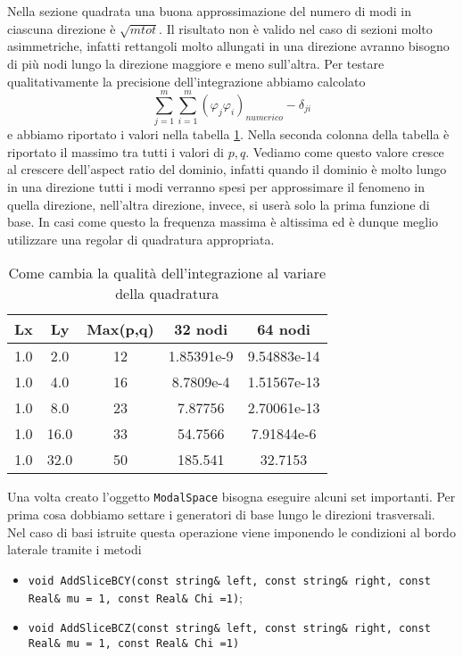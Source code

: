 Nella sezione quadrata una buona approssimazione del numero di modi in ciascuna direzione \`e $\sqrt{mtot}$. Il risultato non \`e valido nel caso di sezioni 
molto asimmetriche, infatti rettangoli molto allungati in una direzione avranno bisogno di pi\`u nodi lungo la direzione maggiore e meno 
sull'altra. Per testare qualitativamente la precisione dell'integrazione abbiamo calcolato $$\sum_{j=1}^m\sum_{i=1}^m 
(\varphi_j\varphi_i)_{numerico}- \delta_{ji}$$ e abbiamo riportato i valori nella tabella \ref{quad}.
Nella seconda colonna della tabella \`e riportato il massimo tra tutti i valori di $p,q$. Vediamo come questo valore cresce 
al crescere dell'aspect ratio del dominio, infatti quando il dominio \`e molto lungo in una direzione tutti i modi verranno spesi
per approssimare il fenomeno in quella direzione, nell'altra direzione, invece, si user\`a solo la prima funzione di base.
In casi come questo la frequenza massima \`e altissima ed \`e dunque meglio utilizzare una regolar di quadratura appropriata.
\begin{table}[h]
\centering
\begin{tabular}{|c|c|c|c|c|}
\hline
Lx&Ly & Max(p,q) &  32 nodi &  64 nodi \\
\hline
1.0&2.0 & 12 & 1.85391e-9 & 9.54883e-14 \\
\hline
1.0&4.0 & 16 & 8.7809e-4 & 1.51567e-13 \\
\hline
1.0&8.0 & 23 & 7.87756 & 2.70061e-13 \\
\hline
1.0&16.0 & 33 & 54.7566 & 7.91844e-6 \\
\hline
1.0&32.0 & 50 & 185.541 & 32.7153 \\
\hline
\end{tabular}
\caption{Come cambia la qualit\`a dell'integrazione al variare della quadratura}
\label{quad}
\end{table}

Una volta creato l'oggetto \texttt{ModalSpace} bisogna eseguire alcuni set importanti. Per prima cosa dobbiamo settare i generatori di base 
lungo le direzioni trasversali. Nel caso di basi istruite questa operazione viene imponendo le condizioni al bordo laterale
tramite i metodi
\begin{itemize}
\item \texttt{void AddSliceBCY(const string\& left, const string\& right, const Real\& mu = 1, const Real\& Chi =1)};
\item \texttt{void AddSliceBCZ(const string\& left, const string\& right, const Real\& mu = 1, const Real\& Chi =1)}
\end{itemize}


